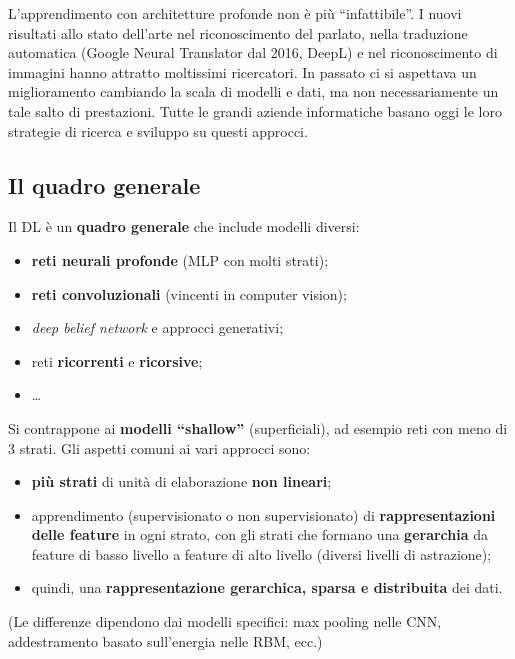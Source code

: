 L'apprendimento con architetture profonde non è più ``infattibile''. I
nuovi risultati allo stato dell'arte nel riconoscimento del parlato,
nella traduzione automatica (Google Neural Translator dal 2016, DeepL) e
nel riconoscimento di immagini hanno attratto moltissimi ricercatori. In
passato ci si aspettava un miglioramento cambiando la scala di modelli e
dati, ma non necessariamente un tale salto di prestazioni. Tutte le
grandi aziende informatiche basano oggi le loro strategie di ricerca e
sviluppo su questi approcci.

\subsection{Il quadro generale}\label{il-quadro-generale}

Il DL è un \textbf{quadro generale} che include modelli diversi:

\begin{itemize}
\tightlist
\item
  \textbf{reti neurali profonde} (MLP con molti strati);
\item
  \textbf{reti convoluzionali} (vincenti in computer vision);
\item
  \emph{deep belief network} e approcci generativi;
\item
  reti \textbf{ricorrenti} e \textbf{ricorsive};
\item
  \ldots{}
\end{itemize}

Si contrappone ai \textbf{modelli ``shallow''} (superficiali), ad
esempio reti con meno di 3 strati. Gli aspetti comuni ai vari approcci
sono:

\begin{itemize}
\tightlist
\item
  \textbf{più strati} di unità di elaborazione \textbf{non lineari};
\item
  apprendimento (supervisionato o non supervisionato) di
  \textbf{rappresentazioni delle feature} in ogni strato, con gli strati
  che formano una \textbf{gerarchia} da feature di basso livello a
  feature di alto livello (diversi livelli di astrazione);
\item
  quindi, una \textbf{rappresentazione gerarchica, sparsa e distribuita}
  dei dati.
\end{itemize}

(Le differenze dipendono dai modelli specifici: max pooling nelle CNN,
addestramento basato sull'energia nelle RBM, ecc.)

